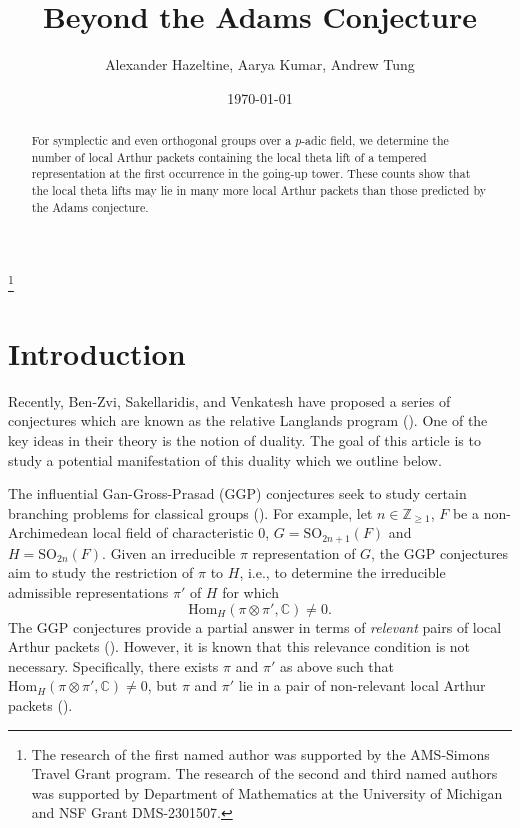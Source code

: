 \documentclass[11pt,letterpaper]{amsart}
\newcommand{\Hom}{{\mathrm{Hom}}}
\newcommand{\SO}{\mathrm{SO}}
\numberwithin{equation}{section}
\begin{document}
\title{Beyond the Adams Conjecture}
\author{Alexander Hazeltine, Aarya Kumar, Andrew Tung}
\date{\today}
\thanks{The research of the first named author was supported by the AMS-Simons Travel Grant program. The research of the second and third named authors was supported by Department of Mathematics at the University of Michigan and NSF Grant DMS-2301507.}


\begin{abstract}
    For symplectic and even orthogonal groups over a $p$-adic field, we determine the number of local Arthur packets containing the local theta lift of a tempered representation at the first occurrence in the going-up tower. These counts show that the local theta lifts may lie in many more local Arthur packets than those predicted by the Adams conjecture.
\end{abstract}

\maketitle

\tableofcontents

\section{Introduction}\label{sec intro}

Recently, Ben-Zvi, Sakellaridis, and Venkatesh have proposed a series of conjectures which are known as the relative Langlands program (\cite{BZSV24}). One of the key ideas in their theory is the notion of duality. The goal of this article is to study a potential manifestation of this duality which we outline below.

The influential Gan-Gross-Prasad (GGP) conjectures seek to study certain branching problems for classical groups (\cite{GGP12, GGP20}). For example, let $n\in\mathbb{Z}_{\geq 1}$, $F$ be a non-Archimedean local field of characteristic 0, $G=\SO_{2n+1}(F)$ and $H=\SO_{2n}(F).$ Given an irreducible $\pi$ representation of $G$, the GGP conjectures aim to study the restriction of $\pi$ to $H$, i.e., to determine the irreducible admissible representations $\pi'$ of $H$ for which
\[
\Hom_H(\pi\otimes \pi',\mathbb{C})\neq 0.
\]
The GGP conjectures provide a partial answer in terms of \emph{relevant} pairs of local Arthur packets (\cite[Conjectures 6.1 and 7.1]{GGP20}). However, it is known that this relevance condition is not necessary. Specifically, there exists $\pi$ and $\pi'$ as above such that $\Hom_H(\pi\otimes \pi',\mathbb{C})\neq 0$, but $\pi$ and $\pi'$ lie in a pair of non-relevant local Arthur packets (\cite[\S7]{GGP20}).  
\end{document}
